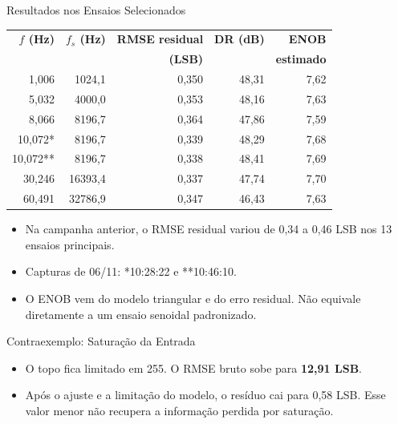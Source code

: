 \begin{frame}{Resultados nos Ensaios Selecionados}
\small
\begin{center}
\begin{tabular}{rrrrr}
\hline
\textbf{$f$ (Hz)} & \textbf{$f_s$ (Hz)} & \textbf{RMSE residual} & \textbf{DR (dB)} & \textbf{ENOB}\\
 & & \textbf{(LSB)} & & \textbf{estimado}\\\hline
1,006 & 1024,1 & 0,350 & 48,31 & 7,62\\
5,032 & 4000,0 & 0,353 & 48,16 & 7,63\\
8,066 & 8196,7 & 0,364 & 47,86 & 7,59\\
10,072* & 8196,7 & 0,339 & 48,29 & 7,68\\
10,072** & 8196,7 & 0,338 & 48,41 & 7,69\\
30,246 & 16393,4 & 0,337 & 47,74 & 7,70\\
60,491 & 32786,9 & 0,347 & 46,43 & 7,63\\\hline
\end{tabular}
\end{center}
\begin{itemize}
\item Na campanha anterior, o RMSE residual variou de 0,34 a 0,46 LSB nos 13 ensaios principais.
\item Capturas de 06/11: *10:28:22 e **10:46:10.
\item O ENOB vem do modelo triangular e do erro residual. Não equivale diretamente a um ensaio senoidal padronizado.
\end{itemize}
\end{frame}

\begin{frame}{Contraexemplo: Saturação da Entrada}
\centering
{}
\begin{itemize}
\item O topo fica limitado em 255. O RMSE bruto sobe para \textbf{12,91 LSB}.
\item Após o ajuste e a limitação do modelo, o resíduo cai para 0,58 LSB. Esse valor menor não recupera a informação perdida por saturação.
\end{itemize}
\end{frame}

